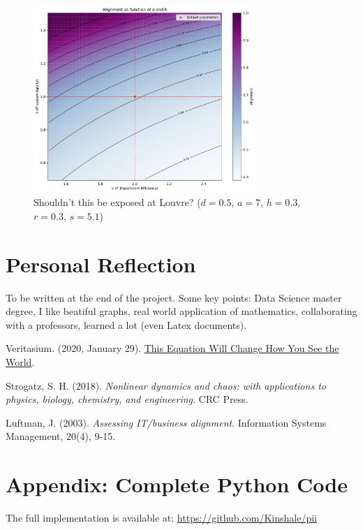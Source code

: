 \documentclass[a4paper, 10pt]{article}
\begin{document}
\begin{figure}[h]
	\centering
	\includegraphics[width=0.75\textwidth]{../images/int-cases/sim-1.pdf}
	\caption{Shouldn't this be exposed at Louvre? ($d = 0.5$, $a = 7$, $h = 0.3$, $r = 0.3$, $s = 5.1$)}
	\label{fig:countour plot}
\end{figure}

\section{Personal Reflection}
To be written at the end of the project. 
Some key points: Data Science master degree, I like beatiful graphs, real world application of mathematics, collaborating with a professors, learned a lot (even Latex documents).

\begin{thebibliography}{9}
    Veritasium. (2020, January 29). \href{https://www.veritasium.com/videos/2020/1/29/this-equation-will-change-how-you-see-the-world}{This Equation Will Change How You See the World}.

	Strogatz, S. H. (2018). \textit{Nonlinear dynamics and chaos: with applications to physics, biology, chemistry, and engineering}. CRC Press.

	Luftman, J. (2003). \textit{Assessing IT/business alignment}. Information Systems Management, 20(4), 9-15.
\end{thebibliography}

\appendix
\section{Appendix: Complete Python Code}
The full implementation is available at: \url{https://github.com/Kinshale/pii}
\end{document}
